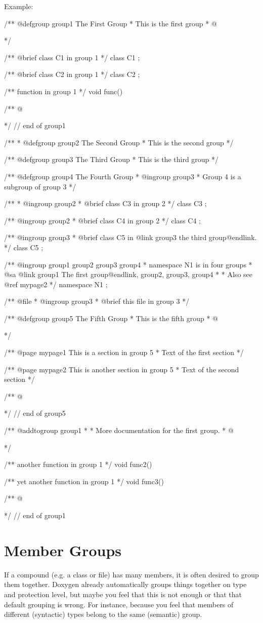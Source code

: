 \begin{DoxyParagraph}{Example:}

\begin{DoxyVerbInclude}
/** @defgroup group1 The First Group
 *  This is the first group
 *  @{
 */

/** @brief class C1 in group 1 */
class C1 {};

/** @brief class C2 in group 1 */
class C2 {};

/** function in group 1 */
void func() {}

/** @} */ // end of group1

/**
 *  @defgroup group2 The Second Group
 *  This is the second group
 */

/** @defgroup group3 The Third Group
 *  This is the third group
 */

/** @defgroup group4 The Fourth Group
 *  @ingroup group3
 *  Group 4 is a subgroup of group 3
 */

/**
 *  @ingroup group2
 *  @brief class C3 in group 2
 */
class C3 {};

/** @ingroup group2
 *  @brief class C4 in group 2
 */
class C4 {};

/** @ingroup group3
 *  @brief class C5 in @link group3 the third group@endlink.
 */
class C5 {};

/** @ingroup group1 group2 group3 group4
 *  namespace N1 is in four groups
 *  @sa @link group1 The first group@endlink, group2, group3, group4 
 *
 *  Also see @ref mypage2
 */
namespace N1 {};

/** @file
 *  @ingroup group3
 *  @brief this file in group 3
 */

/** @defgroup group5 The Fifth Group
 *  This is the fifth group
 *  @{
 */

/** @page mypage1 This is a section in group 5
 *  Text of the first section
 */

/** @page mypage2 This is another section in group 5
 *  Text of the second section
 */

/** @} */ // end of group5

/** @addtogroup group1
 *  
 *  More documentation for the first group.
 *  @{
 */

/** another function in group 1 */
void func2() {}

/** yet another function in group 1 */
void func3() {}

/** @} */ // end of group1

\end{DoxyVerbInclude}

\end{DoxyParagraph}
\hypertarget{grouping_memgroup}{}\section{Member Groups}\label{grouping_memgroup}
If a compound (e.g. a class or file) has many members, it is often desired to group them together. Doxygen already automatically groups things together on type and protection level, but maybe you feel that this is not enough or that that default grouping is wrong. For instance, because you feel that members of different (syntactic) types belong to the same (semantic) group.

